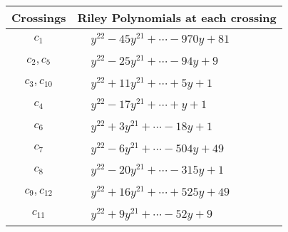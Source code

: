 \documentclass[1p]{elsarticle_modified}
\theoremstyle{definition}
\begin{document}
\begin{tabular}{m{50pt}|m{274pt}}
Crossings & \hspace{64pt}Riley Polynomials at each crossing \\
\hline $$\begin{aligned}c_{1}\end{aligned}$$&$\begin{aligned}
&y^{22}-45 y^{21}+\cdots-970 y+81
\end{aligned}$\\
\hline $$\begin{aligned}c_{2},c_{5}\end{aligned}$$&$\begin{aligned}
&y^{22}-25 y^{21}+\cdots-94 y+9
\end{aligned}$\\
\hline $$\begin{aligned}c_{3},c_{10}\end{aligned}$$&$\begin{aligned}
&y^{22}+11 y^{21}+\cdots+5 y+1
\end{aligned}$\\
\hline $$\begin{aligned}c_{4}\end{aligned}$$&$\begin{aligned}
&y^{22}-17 y^{21}+\cdots+y+1
\end{aligned}$\\
\hline $$\begin{aligned}c_{6}\end{aligned}$$&$\begin{aligned}
&y^{22}+3 y^{21}+\cdots-18 y+1
\end{aligned}$\\
\hline $$\begin{aligned}c_{7}\end{aligned}$$&$\begin{aligned}
&y^{22}-6 y^{21}+\cdots-504 y+49
\end{aligned}$\\
\hline $$\begin{aligned}c_{8}\end{aligned}$$&$\begin{aligned}
&y^{22}-20 y^{21}+\cdots-315 y+1
\end{aligned}$\\
\hline $$\begin{aligned}c_{9},c_{12}\end{aligned}$$&$\begin{aligned}
&y^{22}+16 y^{21}+\cdots+525 y+49
\end{aligned}$\\
\hline $$\begin{aligned}c_{11}\end{aligned}$$&$\begin{aligned}
&y^{22}+9 y^{21}+\cdots-52 y+9
\end{aligned}$\\
\hline
\end{tabular}\\~\\
\end{document}
